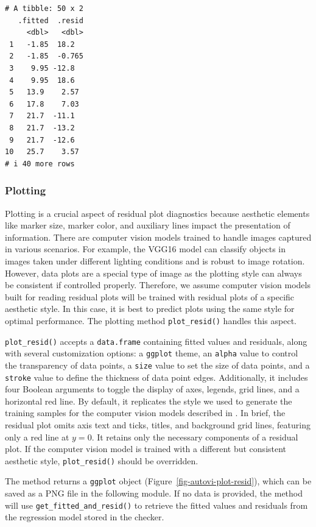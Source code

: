 \documentclass[
doublespace,
  times]{anzsauth}
\begin{document}
\begin{verbatim}
# A tibble: 50 x 2
   .fitted  .resid
     <dbl>   <dbl>
 1   -1.85  18.2  
 2   -1.85  -0.765
 3    9.95 -12.8  
 4    9.95  18.6  
 5   13.9    2.57 
 6   17.8    7.03 
 7   21.7  -11.1  
 8   21.7  -13.2  
 9   21.7  -12.6  
10   25.7    3.57 
# i 40 more rows
\end{verbatim}

\subsubsection{Plotting}\label{plotting}

Plotting is a crucial aspect of residual plot diagnostics because
aesthetic elements like marker size, marker color, and auxiliary lines
impact the presentation of information. There are computer vision models
trained to handle images captured in various scenarios. For example, the
VGG16 model \citep{simonyan2014very} can classify objects in images
taken under different lighting conditions and is robust to image
rotation. However, data plots are a special type of image as the
plotting style can always be consistent if controlled properly.
Therefore, we assume computer vision models built for reading residual
plots will be trained with residual plots of a specific aesthetic style.
In this case, it is best to predict plots using the same style for
optimal performance. The plotting method \texttt{plot\_resid()} handles
this aspect.

\texttt{plot\_resid()} accepts a \texttt{data.frame} containing fitted
values and residuals, along with several customization options: a
\texttt{ggplot} theme, an \texttt{alpha} value to control the
transparency of data points, a \texttt{size} value to set the size of
data points, and a \texttt{stroke} value to define the thickness of data
point edges. Additionally, it includes four Boolean arguments to toggle
the display of axes, legends, grid lines, and a horizontal red line. By
default, it replicates the style we used to generate the training
samples for the computer vision models described in
\citet{li2024automated}. In brief, the residual plot omits axis text and
ticks, titles, and background grid lines, featuring only a red line at
\(y = 0\). It retains only the necessary components of a residual plot.
If the computer vision model is trained with a different but consistent
aesthetic style, \texttt{plot\_resid()} should be overridden.

The method returns a \texttt{ggplot} object
(Figure~\ref{fig-autovi-plot-resid}), which can be saved as a PNG file
in the following module. If no data is provided, the method will use
\texttt{get\_fitted\_and\_resid()} to retrieve the fitted values and
residuals from the regression model stored in the checker.
\end{document}
